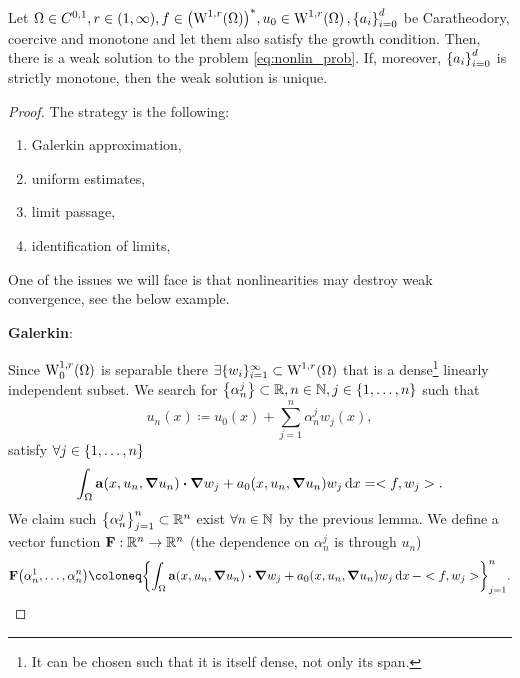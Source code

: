 \documentclass{article}
\begin{document}
\begin{theorem}
	Let $\Omega \in C^{0,1}, r \in (1,\infty),f \in \qty(\WkpSet[1][r]{\Omega})^{*}, u_0 \in \WkpSet[1][r]{\Omega},  \qty{a_i}_{i=0}^d$ be Caratheodory, coercive and monotone and let them also satisfy the growth condition. Then, there is a weak solution to the problem \ref{eq:nonlin_prob}.
	If, moreover, $\qty{a_i}_{i=0}^d$ is strictly monotone, then the weak solution is unique.
\end{theorem}

\begin{proof}
	The strategy is the following:
	\begin{enumerate}
		\item Galerkin approximation,
		\item uniform estimates,
		\item limit passage,
		\item identification of limits,
	\end{enumerate}
	One of the issues we will face is that nonlinearities may destroy weak convergence, see the below example. 

	\textbf{Galerkin}: 

	Since $\WkpzeroSet[1][r]{\Omega}$ is separable there $\exists \{w_i\}_{i=1}^{\infty} \subset \WkpSet[1][r]{\Omega}$ that is a dense\footnote{It can be chosen such that it is itself dense, not only its span.} linearly independent subset. We search for $\qty{\alpha_n^j} \subset {\mathbb R}, n \in {\mathbb N}, j \in \qty{1, \dots, n}$ such that
	\[
		u_n(x) \coloneq u_0(x) + \sum_{j=1}^n \alpha^j_n w_j(x),
	\]
	satisfy $\forall j \in \qty{1, \dots, n}$
	\[
		\int_{\Omega}\vb{a}\qty(x, u_n, \grad u_n) \vdot \grad w_j + a_0\qty(x,u_n,\grad u_n)w_j\dd{x} = <f,w_j>.
	\]
	We claim such $\qty{\alpha^j_n}_{j=1}^n \subset {\mathbb R}^n$ exist $\forall n \in {\mathbb N}$ by the previous lemma. We define a vector function $\vb{F}: {\mathbb R}^{n} \to {\mathbb R}^{n}$  (the dependence on $\alpha_n^j$ is through $u_n$)
	\[
		\vb{F}\qty(\alpha^1_n, \dots, \alpha^n_n)\coloneq \qty{ \int_{\Omega}\vb{a}\qty(x, u_n, \grad u_n) \vdot \grad w_j + a_0\qty(x, u_n, \grad u_n) w_j \dd{x} - <f,w_j>}_{j=1}^n.
	\]


\end{proof}
\end{document}
